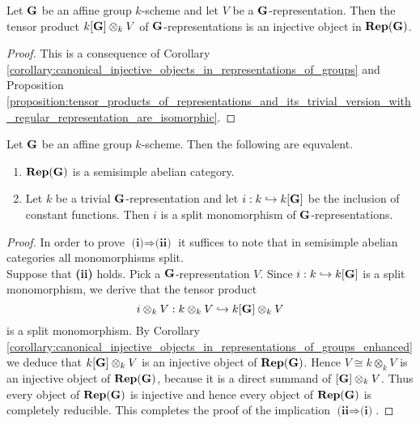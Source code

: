 \begin{corollary}\label{corollary:canonical_injective_objects_in_representations_of_groups_enhanced}
Let $\mathbf{G}$ be an affine group $k$-scheme and let $V$ be a $\mathbf{G}$-representation. Then the tensor product $k[\mathbf{G}]\otimes_kV$ of $\mathbf{G}$-representations is an injective object in $\mathbf{Rep}(\mathbf{G})$.
\end{corollary}
\begin{proof}
This is a consequence of Corollary \ref{corollary:canonical_injective_objects_in_representations_of_groups} and Proposition \ref{proposition:tensor_products_of_representations_and_its_trivial_version_with_regular_representation_are_isomorphic}.
\end{proof}

\begin{theorem}\label{theorem:characterization_of_fully_reducible_groups}
Let $\mathbf{G}$ be an affine group $k$-scheme. Then the following are equvalent.
\begin{enumerate}[label=\emph{\textbf{(\roman*)}}, leftmargin=3.0em]
\item $\mathbf{Rep}(\mathbf{G})$ is a semisimple abelian category.
\item Let $k$ be a trivial $\mathbf{G}$-representation and let $i:k\hookrightarrow k[\mathbf{G}]$ be the inclusion of constant functions. Then $i$ is a split monomorphism of $\mathbf{G}$-representations.
\end{enumerate}
\end{theorem}
\begin{proof}
In order to prove $\textbf{(i)}\Rightarrow \textbf{(ii)}$ it suffices to note that in semisimple abelian categories all monomorphisms split.\\
Suppose that \textbf{(ii)} holds. Pick a $\mathbf{G}$-representation $V$. Since $i:k\hookrightarrow k[\mathbf{G}]$ is a split monomorphism, we derive that the tensor product
$$i\otimes_kV:k\otimes_kV\hookrightarrow k[\mathbf{G}]\otimes_kV$$
is a split monomorphism. By Corollary \ref{corollary:canonical_injective_objects_in_representations_of_groups_enhanced} we deduce that $k[\mathbf{G}]\otimes_kV$ is an injective object of $\mathbf{Rep}(\mathbf{G})$. Hence $V \cong k\otimes_kV$ is an injective object of $\mathbf{Rep}(\mathbf{G})$, because it is a direct summand of $[\mathbf{G}]\otimes_kV$. Thus every object of $\mathbf{Rep}(\mathbf{G})$ is injective and hence every object of $\mathbf{Rep}(\mathbf{G})$ is completely reducible. This completes the proof of the implication $\textbf{(ii}\Rightarrow \textbf{(i)}$.
\end{proof}

